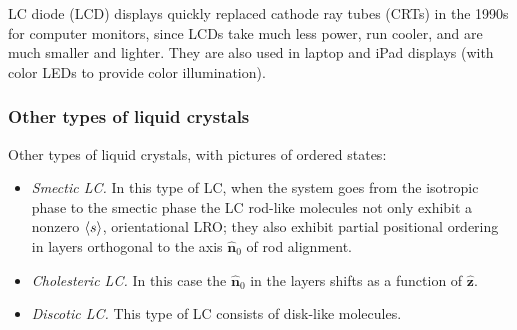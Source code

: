 \begin{diagram}
\end{diagram}

LC diode (LCD) displays quickly replaced cathode ray tubes (CRTs) in the 1990s for computer monitors, since LCDs take much
less power, run cooler, and are much smaller and lighter. They are also used in laptop and iPad displays (with color LEDs
to provide color illumination).

\subsubsection*{Other types of liquid crystals}

Other types of liquid crystals, with pictures of ordered states:
\begin{itemize}
  \item \emph{Smectic LC.} In this type of LC, when the system goes from the isotropic phase to the smectic phase the LC
    rod-like molecules not only exhibit a nonzero $\langle s\rangle$, orientational LRO; they also exhibit partial positional
    ordering in layers orthogonal to the axis $\hat{\mathbf n}_0$ of rod alignment.
  \item \emph{Cholesteric LC.} In this case the $\hat{\mathbf n}_0$ in the layers shifts as a function of $\hat{\mathbf z}$.
  \item \emph{Discotic LC.} This type of LC consists of disk-like molecules.
\end{itemize}

